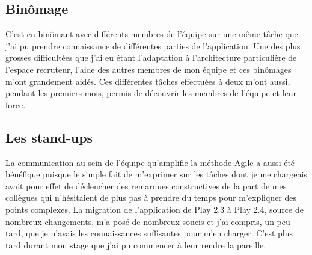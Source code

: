 \subsection{Binômage}
C'est en binômant avec différents membres de l'équipe sur une même tâche que j'ai pu prendre connaissance de différentes parties de l'application.
Une des plus grosses difficultées que j'ai eu étant l'adaptation à l'architecture particulière de l'espace recruteur, l'aide des autres membres de mon équipe et ces binômages m'ont grandement aidés.
Ces différentes tâches effectuées à deux m'ont aussi, pendant les premiers mois, permis de découvrir les membres de l'équipe et leur force.
\subsection{Les stand-ups}
La communication au sein de l'équipe qu'amplifie la méthode Agile a aussi été bénéfique puisque le simple fait de m'exprimer sur les tâches dont je me chargeais avait pour effet de déclencher des remarques constructives de la part de mes collègues qui n'hésitaient de plus pas à prendre du temps pour m'expliquer des points complexes.
La migration de l'application de Play 2.3 à Play 2.4, source de nombreux changements, m'a posé de nombreux soucis et j'ai compris, un peu tard, que je n'avais les connaissances suffisantes pour m'en charger.
C'est plus tard durant mon stage que j'ai pu commencer à leur rendre la pareille.
